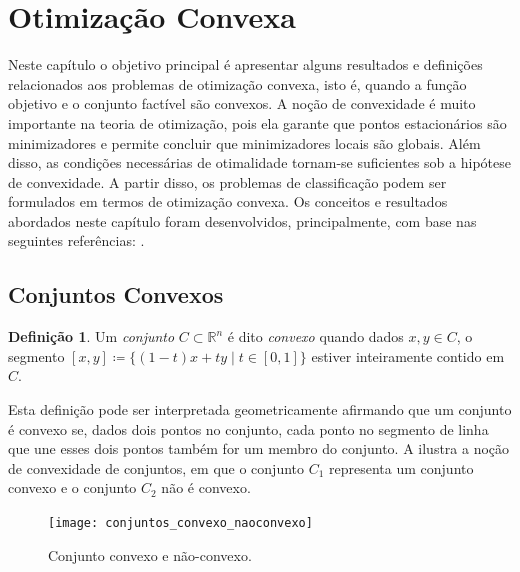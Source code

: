\documentclass[12pt,a4paper]{scrartcl}
\def\RR{\mathds{R}}
\theoremstyle{definition}%
\newtheorem{defi}{Definição}
\begin{document}

\newpage

\section{Otimização Convexa} \label{chap:otimizacao_convexa}

Neste capítulo o objetivo principal é apresentar alguns resultados e definições relacionados aos problemas de otimização convexa, isto é, quando a função objetivo e o conjunto factível são convexos. A noção de convexidade é muito importante na teoria de otimização, pois ela garante que pontos estacionários são minimizadores e permite concluir que minimizadores locais são globais. Além disso, as condições necessárias de otimalidade tornam-se suficientes sob a hipótese de convexidade. A partir disso, os problemas de classificação podem ser formulados em termos de otimização convexa. Os conceitos e resultados abordados neste capítulo foram desenvolvidos, principalmente, com base nas seguintes referências: \textcite{Evelin2017,Ademir2013,Izmailov2014ac}.

\subsection{Conjuntos Convexos}

\begin{defi} 
Um \emph{conjunto} $C \subset \RR^{n}$ é dito \emph{convexo} quando dados $x,y \in C$, o segmento $[x,y] \coloneqq \{ (1-t)x + ty \mid t\in [0,1] \}$ estiver inteiramente contido em $C$.
\end{defi}

Esta definição pode ser interpretada geometricamente afirmando que um conjunto é convexo se, dados dois pontos no conjunto, cada ponto no segmento de linha que une esses dois pontos também for um membro do conjunto. A  ilustra a noção de convexidade de conjuntos, em que o conjunto $C_{1}$ representa um conjunto convexo e o conjunto $C_{2}$ não é convexo.


\begin{figure}[!ht] 
	\centering
	\texttt{[image: conjuntos\_convexo\_naoconvexo]}
	\caption{ Conjunto convexo e não-convexo. \label{fig:conjuntos_convexos}}
\end{figure}
\end{document}
